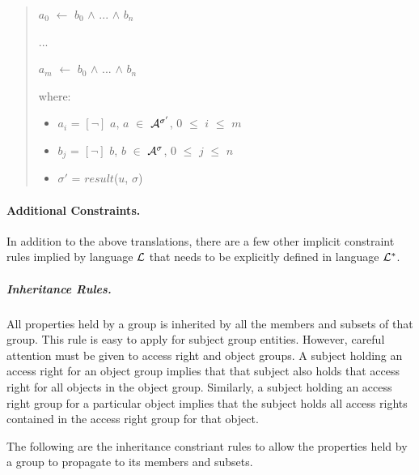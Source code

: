\documentclass[10pt, twocolumn]{article}
\begin{document}
          \begin{quote}
            $a_{0}$ $\leftarrow$ $b_{0}$ $\land$ ... $\land$ $b_{n}$

            ...

            $a_{m}$ $\leftarrow$ $b_{0}$ $\land$ ... $\land$ $b_{n}$

            where:

            \begin{itemize}
              \item
                $a_{i}$ = $[\lnot]$ $a$, $a$ $\in$ ${\cal A}^{\sigma'}$, $0$ $\leq$ $i$ $\leq$ $m$
              \item
                $b_{j}$ = $[\lnot]$ $b$, $b$ $\in$ ${\cal A}^{\sigma}$, $0$ $\leq$ $j$ $\leq$ $n$
              \item
                $\sigma'$ = $result$($u$, $\sigma$)
            \end{itemize}
          \end{quote}

        \paragraph{Additional Constraints.}

          In addition to the above translations, there are a few other implicit
          constraint rules implied by language ${\cal L}$ that needs to be
          explicitly defined in language ${\cal L}^{*}$.

          \subparagraph{Inheritance Rules.}

            All properties held by a group is inherited by all the members and
            subsets of that group. This rule is easy to apply for subject group
            entities. However, careful attention must be given to access right
            and object groups. A subject holding an access right for an object
            group implies that that subject also holds that access right for
            all objects in the object group. Similarly, a subject holding an
            access right group for a particular object implies that the subject
            holds all access rights contained in the access right group for
            that object.

            The following are the inheritance constriant rules to allow the
            properties held by a group to propagate to its members and
            subsets.
\end{document}
